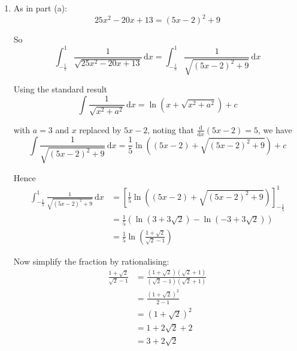 \documentclass[leqno]{article}
\begin{document}
\begin{enumerate}[
  label=\textbf{\arabic*.},
  leftmargin=*,
  topsep=0pt,
  partopsep=0pt,
  parsep=0pt
]
\begin{djsSolution}
\begin{enumerate}[label=\textbf{(\alph*)}]
  So
  \[
  \int_{-\frac15}^{1}\frac{1}{25x^2-20x+13}\,\mathrm{d}x
  = \int_{-\frac15}^{1}\frac{1}{(5x-2)^2+9}\,\mathrm{d}x
  \]

  Using the standard result
  \[
  \int \frac{1}{x^2+a^2}\,\mathrm{d}x=\frac{1}{a}\arctan\left(\frac{x}{a}\right)+c
  \]

  with \(a=3\) and \(x\) replaced by \(5x-2\), noting that \(\frac{\mathrm{d}}{\mathrm{d}x}(5x-2)=5\), we get
  \begin{align*}
  \int_{-\frac15}^{1}\frac{1}{(5x-2)^2+9}\,\mathrm{d}x
  &= \left[\frac{1}{15}\arctan\left(\frac{5x-2}{3}\right)\right]_{-\frac15}^{1} \\
  &= \frac{1}{15}\left(\arctan 1-\arctan(-1)\right) \\
  &= \frac{1}{15}\left(\frac{\pi}{4}-\left(-\frac{\pi}{4}\right)\right) \\
  &= \frac{1}{15}\times\frac{\pi}{2} \\
  &= \frac{\pi}{30}
  \end{align*}

  \item As in part (a):
  \[
  25x^2-20x+13=(5x-2)^2+9
  \]

  So
  \[
  \int_{-\frac15}^{1}\frac{1}{\sqrt{25x^2-20x+13}}\,\mathrm{d}x
  = \int_{-\frac15}^{1}\frac{1}{\sqrt{(5x-2)^2+9}}\,\mathrm{d}x
  \]

  Using the standard result
  \[
  \int \frac{1}{\sqrt{x^2+a^2}}\,\mathrm{d}x
  = \ln\left(x+\sqrt{x^2+a^2}\right)+c
  \]

  with \(a=3\) and \(x\) replaced by \(5x-2\), noting that \(\frac{\mathrm{d}}{\mathrm{d}x}(5x-2)=5\), we have
  \[
  \int \frac{1}{\sqrt{(5x-2)^2+9}}\,\mathrm{d}x
  =
  \frac15\ln\left((5x-2)+\sqrt{(5x-2)^2+9}\right)+c
  \]

  Hence
  \begin{align*}
  \int_{-\frac15}^{1}\frac{1}{\sqrt{(5x-2)^2+9}}\,\mathrm{d}x
  &= \left[\frac15\ln\left((5x-2)+\sqrt{(5x-2)^2+9}\right)\right]_{-\frac15}^{1} \\
  &= \frac15\left(\ln(3+3\sqrt2)-\ln(-3+3\sqrt2)\right) \\
  &= \frac15\ln\left(\frac{1+\sqrt2}{\sqrt2-1}\right)
  \end{align*}

  Now simplify the fraction by rationalising:
  \begin{align*}
  \frac{1+\sqrt2}{\sqrt2-1}
  &= \frac{(1+\sqrt2)(\sqrt2+1)}{(\sqrt2-1)(\sqrt2+1)} \\
  &= \frac{(1+\sqrt2)^2}{2-1} \\
  &= (1+\sqrt2)^2 \\
  &= 1+2\sqrt2+2 \\
  &= 3+2\sqrt2
  \end{align*}


\end{enumerate}
\end{djsSolution}
\end{enumerate}
\end{document}

